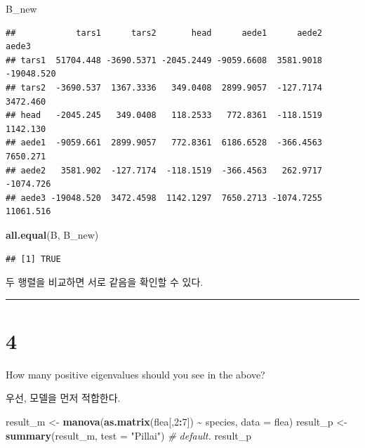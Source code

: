 \documentclass[
]{article}
\newenvironment{Shaded}{\begin{snugshade}}{\end{snugshade}}
\newcommand{\AttributeTok}[1]{\textcolor[rgb]{0.13,0.29,0.53}{#1}}
\newcommand{\CommentTok}[1]{\textcolor[rgb]{0.56,0.35,0.01}{\textit{#1}}}
\newcommand{\DecValTok}[1]{\textcolor[rgb]{0.00,0.00,0.81}{#1}}
\newcommand{\FunctionTok}[1]{\textcolor[rgb]{0.13,0.29,0.53}{\textbf{#1}}}
\newcommand{\NormalTok}[1]{#1}
\newcommand{\OtherTok}[1]{\textcolor[rgb]{0.56,0.35,0.01}{#1}}
\newcommand{\SpecialCharTok}[1]{\textcolor[rgb]{0.81,0.36,0.00}{\textbf{#1}}}
\newcommand{\StringTok}[1]{\textcolor[rgb]{0.31,0.60,0.02}{#1}}
\begin{document}
\begin{Shaded}
\begin{Highlighting}[]
\NormalTok{B\_new}
\end{Highlighting}
\end{Shaded}

\begin{verbatim}
##            tars1      tars2       head      aede1      aede2      aede3
## tars1  51704.448 -3690.5371 -2045.2449 -9059.6608  3581.9018 -19048.520
## tars2  -3690.537  1367.3336   349.0408  2899.9057  -127.7174   3472.460
## head   -2045.245   349.0408   118.2533   772.8361  -118.1519   1142.130
## aede1  -9059.661  2899.9057   772.8361  6186.6528  -366.4563   7650.271
## aede2   3581.902  -127.7174  -118.1519  -366.4563   262.9717  -1074.726
## aede3 -19048.520  3472.4598  1142.1297  7650.2713 -1074.7255  11061.516
\end{verbatim}

\begin{Shaded}
\begin{Highlighting}[]
\FunctionTok{all.equal}\NormalTok{(B, B\_new)}
\end{Highlighting}
\end{Shaded}

\begin{verbatim}
## [1] TRUE
\end{verbatim}

두 행렬을 비교하면 서로 같음을 확인할 수 있다.

\begin{center}\rule{0.5\linewidth}{0.5pt}\end{center}

\section{4}\label{section-3}

How many positive eigenvalues should you see in the above?

우선, 모델을 먼저 적합한다.

\begin{Shaded}
\begin{Highlighting}[]
\NormalTok{result\_m }\OtherTok{\textless{}{-}} \FunctionTok{manova}\NormalTok{(}\FunctionTok{as.matrix}\NormalTok{(flea[,}\DecValTok{2}\SpecialCharTok{:}\DecValTok{7}\NormalTok{]) }\SpecialCharTok{\textasciitilde{}}\NormalTok{ species, }\AttributeTok{data =}\NormalTok{ flea)}
\NormalTok{result\_p }\OtherTok{\textless{}{-}} \FunctionTok{summary}\NormalTok{(result\_m, }\AttributeTok{test =} \StringTok{"Pillai"}\NormalTok{) }\CommentTok{\# default.}
\NormalTok{result\_p}
\end{Highlighting}
\end{Shaded}
\end{document}
